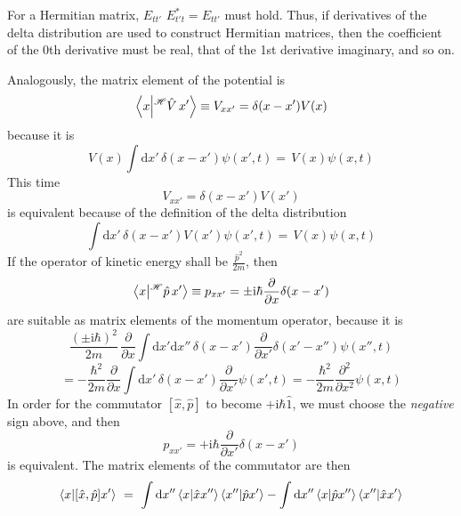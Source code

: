\documentclass[12pt]{article}
\begin{document}
For a Hermitian matrix, $E_{tt'}$ $E_{t't}^* = E_{tt'}$ must hold. Thus, if derivatives of the delta distribution are used to construct Hermitian matrices, then the coefficient of the 0th derivative must be real, that of the 1st derivative imaginary, and so on.

Analogously, the matrix element of the potential is
\begin{equation*}
\bra{x}\ket{^\mathscr{H}\hat{V}\,x'}\equiv V_{xx'} = 
\delta(x-x') V(x)
\end{equation*}
because it is
\begin{equation*}
V(x) \int \mathrm{d}x'\,\delta(x-x') \psi (x',t)
=\, V(x) \psi (x,t)
\end{equation*}
This time
\begin{equation*}
V_{xx'} = \delta(x-x') V(x')
\end{equation*}
is equivalent because of the definition of the delta distribution
\begin{equation*}
\int \mathrm{d}x'\,\delta(x-x') V(x') \psi (x',t)
=\, V(x) \psi (x,t)
\end{equation*}
If the operator of kinetic energy shall be $\frac{\hat{p}^2}{2m}$, then 
\begin{equation*}
\bra{x}\ket{^\mathscr{H}\hat{p}\,x'}\equiv p_{xx'} = 
\pm \mathrm {i} \hbar \frac{\partial }{\partial x}\delta(x-x')
\end{equation*} 
are suitable as matrix elements of the momentum operator, because it is
\begin{equation*}
\frac{(\pm\mathrm{i}\hbar)^2}{2m}\,\frac{\partial }{\partial x} 
\int \mathrm{d}x'\mathrm{d}x''\,\delta(x-x') \frac{\partial }{\partial x'} \delta(x'-x'')\psi(x'',t)
\end{equation*}
\begin{equation*}
=-\frac{\hbar^2}{2m} \frac{\partial }{\partial x}\int \mathrm{d}x'\,\delta(x-x')\frac{\partial }{\partial x'} \psi(x',t)
=-\frac{\hbar^2}{2m} \frac {\partial^2}{\partial x^2}\psi (x,t)
\end{equation*}
In order for the commutator $[\hat{x},\hat{p}]$ to become $+\mathrm{i}\hbar\hat{1}$, we must choose the \emph{negative} sign above, and then
\begin{equation*}
p_{xx'} = + \mathrm {i} \hbar \frac{\partial }{\partial x'}\delta(x-x')
\end{equation*} 
is equivalent. The matrix elements of the commutator are then
\begin{equation*}
\bra{x}\ket{[\hat{x},\hat{p}]x'}\ =\ 
\int \mathrm{d}x'' \bra{x}\ket{\hat{x}x''} \bra{x''}\ket{\hat{p}x'} 
- \int \mathrm{d}x'' \bra{x}\ket{\hat{p}x''} \bra{x''}\ket{\hat{x}x'} 
\end{equation*}
\end{document}
